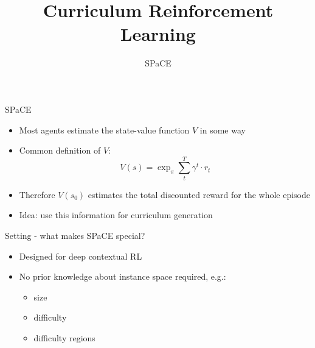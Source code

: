 


\title[Curriculum RL]{Curriculum Reinforcement Learning}
\subtitle{SPaCE}



	
	\maketitle

\begin{frame}[c]{SPaCE~}
	
	\begin{itemize}
		\item Most agents estimate the state-value function $V$ in some way
		\item Common definition of $V$: 
			$$ V(s) = \exp_{\pi} \sum_t^T \gamma^t \cdot r_t $$
		\item Therefore $V(s_0)$ estimates the total discounted reward for the whole episode
		\item Idea: use this information for curriculum generation
	\end{itemize}
	
\end{frame}


\begin{frame}[c]{Setting - what makes SPaCE special?}
	
	\begin{itemize}
		\item Designed for deep contextual RL
		\item No prior knowledge about instance space required, e.g.:
		\begin{itemize}
			\item size
			\item difficulty
			\item difficulty regions
		\end{itemize}
	\end{itemize}
	
\end{frame}

